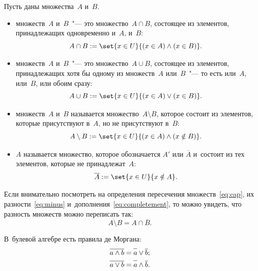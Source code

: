 Пусть даны множества~$A$ и~$B$.
\begin{definition}
	\begin{itemize}
		\item {} множеств~$A$ и~$B$~"--- это множество~$A \cap B$, состоящее из элементов, принадлежащих одновременно и~$A$, и~$B$:
			\begin{equation}
				\label{eq:cap}
				A \cap B :=
				\set{x \in U}{
					(x \in A) \wedge (x \in B)
				}
				.
			\end{equation}

		\item
			 множеств~$A$ и~$B$~"--- это множество~$A \cup B$,
			состоящее из элементов, принадлежащих хотя бы одному из множеств~$A$
			или~$B$~"--- то есть или~$A$, или~$B$, или обоим сразу:
			\[
				A \cup B :=
				\set{x \in U}{
					(x \in A) \vee (x \in B)
				}
				.
			\]

		\item {} множеств~$A$ и~$B$ называется множество~$A \setminus B$, которое состоит из элементов, которые присутствуют в~$A$, но не присутствуют в~$B$:
			\begin{equation}
				\label{eq:minus}
				A \setminus B := 
				\set{x \in U}{
					(x \in A) \wedge (x \notin B)
				}
				.
			\end{equation}

		\item {} $A$ называется множество, которое обозначается $A'$ или $\overline{A}$ и~состоит из тех элементов, которые не принадлежат~$A$:
			\begin{equation}
				\label{eq:completement}
				\overline{A} := \set{x \in U}{x \notin A}
				.
			\end{equation}
	\end{itemize}
\end{definition}

Если внимательно посмотреть на определения пересечения множеств~\eqref{eq:cap}, их разности~\eqref{eq:minus} и~дополнения~\eqref{eq:completement}, то можно увидеть, что разность множеств можно переписать так:
\[
	A \setminus B = A \cap \overline{B}.
\]

В~булевой алгебре есть правила де Моргана:
\begin{align*}
	\overline{a \wedge b} &= \overline{\mathstrut a} \vee   \overline{b};
	\\
	\overline{a \vee b}   &= \overline{\mathstrut a} \wedge \overline{b}.
\end{align*}

